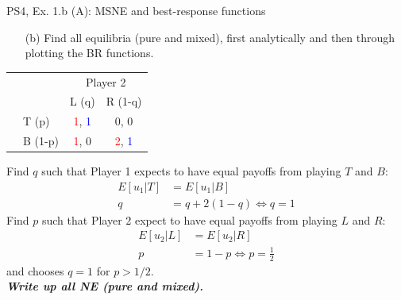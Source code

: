 \begin{frame}{PS4, Ex. 1.b (A): MSNE and best-response functions}
  \begin{multicols}{2}
    \begin{itemize}
      \item[(b)] Find all equilibria (pure and mixed), first analytically and then through plotting the BR functions.
    \end{itemize}
    \vspace{-8pt}
    \begin{table}
      \begin{tabular}{cl|c|c|}
        & \multicolumn{1}{c}{} & \multicolumn{2}{c}{\color{blue}Player 2}\\
        \parbox[t]{1mm}{}
        &  &  &  \\
        & T (p) & \textcolor{red}{1}, \textcolor{blue}{1} & 0, 0 \\
        & B (1-p) & \textcolor{red}{1}, 0 & \textcolor{red}{2}, \textcolor{blue}{1} \\
      \end{tabular}
    \end{table}
    Find $q$ such that Player 1 expects to have equal payoffs from playing $T$ and $B$:
    \begin{align*}
      E[u_1|T]&=E[u_1|B]\\
      q &= q + 2(1-q) \Leftrightarrow q = 1
    \end{align*}
    Find $p$ such that Player 2 expect to have equal payoffs from playing $L$ and $R$:
    \begin{align*}
      E[u_2|L]&=E[u_2|R]\\
      p &= 1-p \Leftrightarrow p = \frac{1}{2}
    \end{align*}
    and chooses $q=1$ for $p>1/2$.\\\medskip
    \textbf{\textit{Write up all NE (pure and mixed).}}
  \vfill\null \columnbreak
  \vfill\null
  \end{multicols}
\end{frame}
